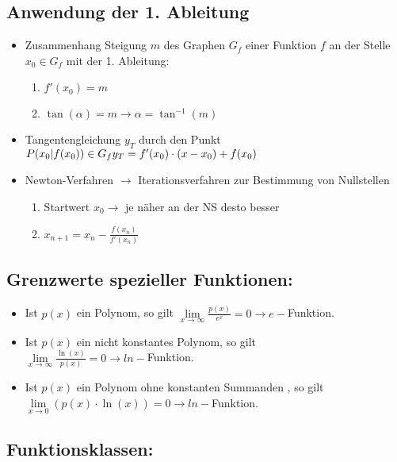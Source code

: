 \documentclass[a4paper,twocolumn,10pt]{onepgnote1}
\begin{document}
\subsection{Anwendung der 1. Ableitung}
\begin{itemize}
\item Zusammenhang Steigung $m$ des Graphen $G_f$ einer Funktion $f$ an der Stelle $x_0 \in G_f$ mit der 1. Ableitung:\\
\begin{enumerate}
\item $f'(x_0) = m$\\
\item $\tan{(\alpha)} = m \longrightarrow \alpha = \tan^{-1}{(m)}$
\end{enumerate}
\item Tangentengleichung $y_T$ durch den Punkt $P(x_0|f(x_0)) \in G_f \\y_T = f'(x_0)\cdot(x-x_0) + f(x_0) $
\item Newton-Verfahren $\longrightarrow$ Iterationsverfahren zur Bestimmung von Nullstellen\\
\begin{enumerate}
    \item Startwert $x_0 \longrightarrow $ je näher an der NS desto besser\\
    \item $x_{n+1} = x_n - \frac{f(x_n)}{f'(x_n)}$
    
\end{enumerate}
\end{itemize}
\subsection{Grenzwerte spezieller Funktionen:}
\begin{itemize}
\item Ist $p(x)$ ein Polynom, so gilt $\lim \limits_{x\longrightarrow \infty} \frac{p(x)}{e^x} = 0 \longrightarrow e-$Funktion.
\item Ist $p(x)$ ein nicht konstantes Polynom, so gilt \\$\lim \limits_{x\longrightarrow \infty} \frac{\ln(x)}{p(x)} = 0 \longrightarrow ln-$Funktion.
\item Ist $p(x)$ ein Polynom ohne konstanten Summanden , so gilt \\$\lim \limits_{x\longrightarrow 0} (p(x)\cdot \ln(x)) = 0\longrightarrow ln-$Funktion.
\end{itemize}
\subsection{Funktionsklassen:}
\end{document}
